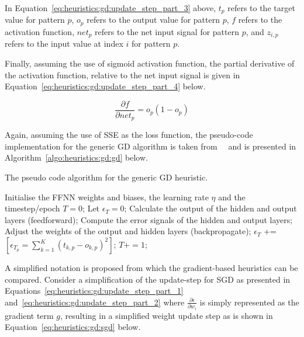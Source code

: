 \noindent
In Equation~\eqref{eq:heuristics:gd:update_step_part_3} above, $t_{p}$ refers to the target value for pattern $p$, $o_{p}$ refers to the output value for pattern $p$, $f$ refers to the activation function, $net_{p}$ refers to the net input signal for pattern $p$, and $z_{i,p}$ refers to the input value at index $i$ for pattern $p$.

Finally, assuming the use of sigmoid activation function, the partial derivative of the activation function, relative to the net input signal is given in Equation~\eqref{eq:heuristics:gd:update_step_part_4} below.

\begin{equation}
      \label{eq:heuristics:gd:update_step_part_4}
      \frac{\partial f}{\partial net_{p}} = o_p(1 - o_{p})
\end{equation}

\noindent
Again, assuming the use of \acs{SSE} as the loss function, the pseudo-code implementation for the generic \acs{GD} algorithm is taken from~\citeauthor{ref:engelbrecht:2007}~\cite{ref:engelbrecht:2007} and is presented in Algorithm~\ref{algo:heuristics:gd:gd} below.

\begin{algorithm}[H]
      \caption{The pseudo code algorithm for the generic \acf{GD} heuristic.}
      \label{algo:heuristics:gd:gd}
      \begin{algorithmic}
            \State Initialise the \acs{FFNN} weights and biases, the learning rate $\eta$ and the timestep/epoch $T=0$;
            \State Let $\epsilon_{T} = 0$;
            \State Calculate the output of the hidden and output layers (feedforward);
            \State Compute the error signals of the hidden and output layers;
            \State Adjust the weights of the output and hidden layers (backpropagate);
            \State $\epsilon_{T}$ += $[\epsilon_{T_{p}} = \sum^{K}_{k=1}(t_{k,p} - o_{k,p})^{2}]$;
            \EndFor
            \State $T += 1$;
            \EndWhile
      \end{algorithmic}
\end{algorithm}

\noindent
A simplified notation is proposed from which the gradient-based heuristics can be compared. Consider a simplification of the update-step for \acs{SGD} as presented in Equations~\eqref{eq:heuristics:gd:update_step_part_1} and~\eqref{eq:heuristics:gd:update_step_part_2} where $\frac{\partial \epsilon}{\partial w_{i}}$ is simply represented as the gradient term $g$, resulting in a simplified weight update step as is shown in Equation~\eqref{eq:heuristics:gd:sgd} below.


